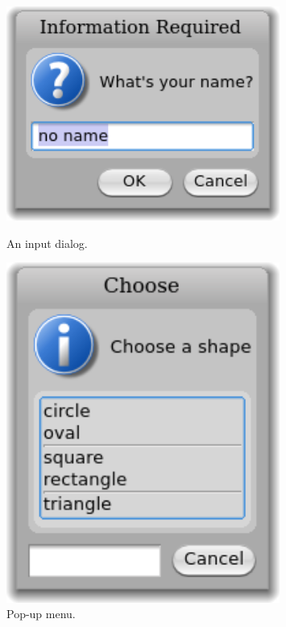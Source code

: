 \documentclass[a4paper,10pt,twoside]{book}
\begin{document}
\begin{figure}[htb]
\begin{minipage}{0.48\textwidth}
	\centerline{\includegraphics[width=0.8\textwidth]{dialog}}
	\caption{An input dialog.}
\end{minipage}
\hfill
\begin{minipage}{0.48\textwidth}
	\vfill
	\centerline{\includegraphics [width=0.8\textwidth]{popup}}
	\vfill
	\vspace{4ex}
	\caption{Pop-up menu.}
\end{minipage}
\end{figure}
\end{document}
